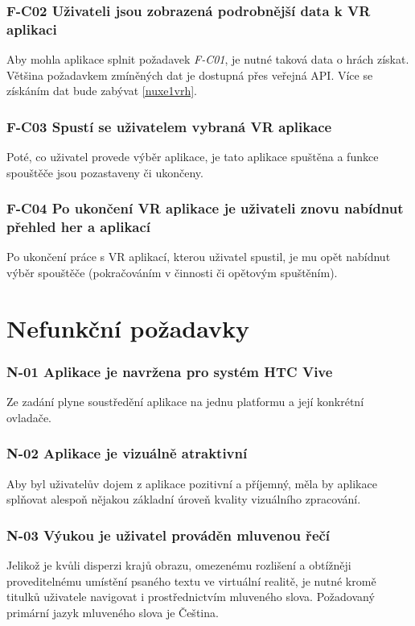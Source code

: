 \subsubsection*{F-C02 Uživateli jsou zobrazená podrobnější data k VR aplikaci}
Aby mohla aplikace splnit požadavek \emph{F-C01}, je nutné taková data o
hrách získat. Většina požadavkem zmíněných dat je dostupná přes veřejná
API. Více se získáním dat bude zabývat \ref{nuxe1vrh}.

\subsubsection*{F-C03 Spustí se uživatelem vybraná VR aplikace}
Poté, co uživatel provede výběr aplikace, je tato aplikace spuštěna a
funkce spouštěče jsou pozastaveny či ukončeny.

\subsubsection*{F-C04 Po ukončení VR aplikace je uživateli znovu nabídnut
přehled her a aplikací}
Po ukončení práce s VR aplikací, kterou uživatel spustil, je mu opět
nabídnut výběr spouštěče (pokračováním v činnosti či opětovým
spuštěním).

\newpage

\section{Nefunkční požadavky}\label{nefunkux10dnuxed-poux17eadavky}

\subsubsection*{N-01 Aplikace je navržena pro systém HTC Vive}
Ze zadání plyne soustředění aplikace na jednu platformu a její konkrétní
ovladače.

\subsubsection*{N-02 Aplikace je vizuálně atraktivní}
Aby byl uživatelův dojem z aplikace pozitivní a příjemný, měla by
aplikace splňovat alespoň nějakou základní úroveň kvality vizuálního
zpracování.

\subsubsection*{N-03 Výukou je uživatel prováděn mluvenou řečí}
Jelikož je kvůli disperzi krajů obrazu, omezenému rozlišení a obtížněji
proveditelnému umístění psaného textu ve virtuální realitě, je nutné
kromě titulků uživatele navigovat i prostřednictvím mluveného slova.
Požadovaný primární jazyk mluveného slova je Čeština.

